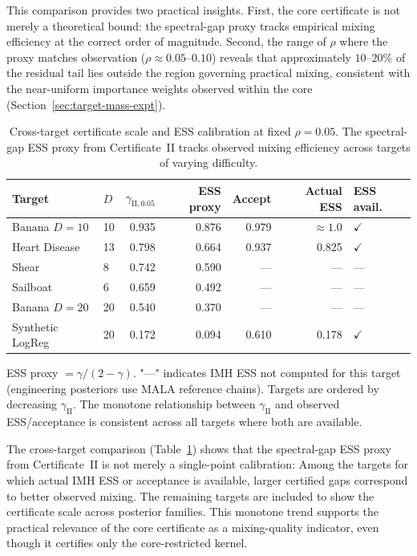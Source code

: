 \documentclass[12pt]{article}
\begin{document}
This comparison provides two practical insights.
First, the core certificate is not merely a theoretical bound: the spectral-gap proxy tracks empirical mixing efficiency at the correct order of magnitude.
Second, the range of $\rho$ where the proxy matches observation ($\rho \approx 0.05$--$0.10$) reveals that approximately $10$--$20\%$ of the residual tail lies outside the region governing practical mixing, consistent with the near-uniform importance weights observed within the core (Section~\ref{sec:target-mass-expt}).

\begin{table}[H]
\centering
\caption{Cross-target certificate scale and ESS calibration at fixed $\rho = 0.05$. The spectral-gap ESS proxy from Certificate~II tracks observed mixing efficiency across targets of varying difficulty.}
\label{tab:cross-ess}
\begin{tabular}{llrrrrl}
\toprule
Target & $D$ & $\gamma_{\mathrm{II},0.05}$ & ESS proxy & Accept & Actual ESS & ESS avail. \\
\midrule
Banana $D=10$ & 10 & 0.935 & 0.876 & 0.979 & $\approx 1.0$ & $\checkmark$ \\
Heart Disease & 13 & 0.798 & 0.664 & 0.937 & 0.825 & $\checkmark$ \\
Shear & 8 & 0.742 & 0.590 & --- & --- & --- \\
Sailboat & 6 & 0.659 & 0.492 & --- & --- & --- \\
Banana $D=20$ & 20 & 0.540 & 0.370 & --- & --- & --- \\
Synthetic LogReg & 20 & 0.172 & 0.094 & 0.610 & 0.178 & $\checkmark$ \\
\bottomrule
\end{tabular}

\smallskip
\begin{minipage}{\linewidth}
\small ESS proxy $= \gamma/(2-\gamma)$. "---" indicates IMH ESS not computed for this target (engineering posteriors use MALA reference chains). Targets are ordered by decreasing $\gamma_{\mathrm{II}}$. The monotone relationship between $\gamma_{\mathrm{II}}$ and observed ESS/acceptance is consistent across all targets where both are available.
\end{minipage}
\end{table}

The cross-target comparison (Table~\ref{tab:cross-ess}) shows that the spectral-gap ESS proxy from Certificate~II is not merely a single-point calibration: Among the targets for which actual IMH ESS or acceptance is available, larger certified gaps correspond to better observed mixing. The remaining targets are included to show the certificate scale across posterior families. This monotone trend supports the practical relevance of the core certificate as a mixing-quality indicator, even though it certifies only the core-restricted kernel.
\end{document}
